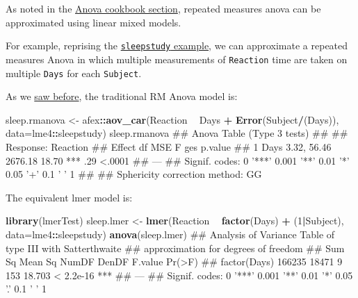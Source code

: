 \documentclass[]{article}
\newenvironment{Shaded}{\begin{snugshade}}{\end{snugshade}}
\newcommand{\KeywordTok}[1]{\textcolor[rgb]{0.13,0.29,0.53}{\textbf{#1}}}
\newcommand{\DataTypeTok}[1]{\textcolor[rgb]{0.13,0.29,0.53}{#1}}
\newcommand{\DecValTok}[1]{\textcolor[rgb]{0.00,0.00,0.81}{#1}}
\newcommand{\StringTok}[1]{\textcolor[rgb]{0.31,0.60,0.02}{#1}}
\newcommand{\OperatorTok}[1]{\textcolor[rgb]{0.81,0.36,0.00}{\textbf{#1}}}
\newcommand{\NormalTok}[1]{#1}
\theoremstyle{definition}
\theoremstyle{definition}
\theoremstyle{definition}
\theoremstyle{remark}
\begin{document}
As noted in the \href{anova-cookbook.html}{Anova cookbook section},
repeated measures anova can be approximated using linear mixed models.

For example, reprising the
\protect\hyperlink{sleepstudy-rmanova}{\texttt{sleepstudy} example}, we
can approximate a repeated measures Anova in which multiple measurements
of \texttt{Reaction} time are taken on multiple \texttt{Days} for each
\texttt{Subject}.

As we \protect\hyperlink{sleepstudy-rmanova}{saw before}, the
traditional RM Anova model is:

\begin{Shaded}
\begin{Highlighting}[]
\NormalTok{sleep.rmanova <-}\StringTok{ }\NormalTok{afex}\OperatorTok{::}\KeywordTok{aov_car}\NormalTok{(Reaction }\OperatorTok{~}\StringTok{ }\NormalTok{Days }\OperatorTok{+}\StringTok{ }\KeywordTok{Error}\NormalTok{(Subject}\OperatorTok{/}\NormalTok{(Days)), }\DataTypeTok{data=}\NormalTok{lme4}\OperatorTok{::}\NormalTok{sleepstudy)}
\NormalTok{sleep.rmanova}
\NormalTok{## Anova Table (Type 3 tests)}
\NormalTok{## }
\NormalTok{## Response: Reaction}
\NormalTok{##   Effect          df     MSE         F ges p.value}
\NormalTok{## 1   Days 3.32, 56.46 2676.18 18.70 *** .29  <.0001}
\NormalTok{## ---}
\NormalTok{## Signif. codes:  0 '***' 0.001 '**' 0.01 '*' 0.05 '+' 0.1 ' ' 1}
\NormalTok{## }
\NormalTok{## Sphericity correction method: GG}
\end{Highlighting}
\end{Shaded}

The equivalent lmer model is:

\begin{Shaded}
\begin{Highlighting}[]
\KeywordTok{library}\NormalTok{(lmerTest)}
\NormalTok{sleep.lmer <-}\StringTok{ }\KeywordTok{lmer}\NormalTok{(Reaction }\OperatorTok{~}\StringTok{ }\KeywordTok{factor}\NormalTok{(Days) }\OperatorTok{+}\StringTok{ }\NormalTok{(}\DecValTok{1}\OperatorTok{|}\NormalTok{Subject), }\DataTypeTok{data=}\NormalTok{lme4}\OperatorTok{::}\NormalTok{sleepstudy)}
\KeywordTok{anova}\NormalTok{(sleep.lmer)}
\NormalTok{## Analysis of Variance Table of type III  with  Satterthwaite }
\NormalTok{## approximation for degrees of freedom}
\NormalTok{##              Sum Sq Mean Sq NumDF DenDF F.value    Pr(>F)    }
\NormalTok{## factor(Days) 166235   18471     9   153  18.703 < 2.2e-16 ***}
\NormalTok{## ---}
\NormalTok{## Signif. codes:  0 '***' 0.001 '**' 0.01 '*' 0.05 '.' 0.1 ' ' 1}
\end{Highlighting}
\end{Shaded}
\end{document}
